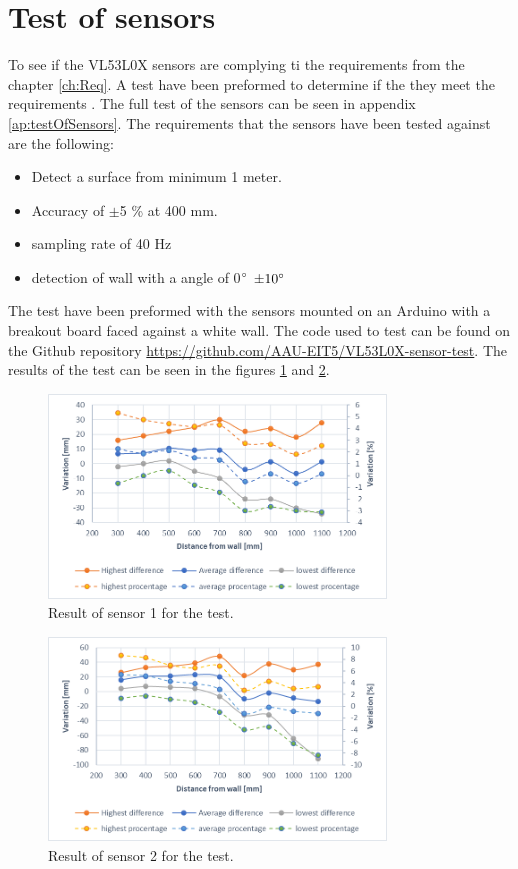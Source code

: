 \section{Test of sensors}
To see if the VL53L0X sensors are complying ti the requirements from the chapter \ref{ch:Req}. A test have been preformed to determine if the they meet the requirements . The full test of the sensors can be seen in appendix \ref{ap:testOfSensors}. The requirements that the sensors have been tested against are the following:
\begin{itemize}
    \item Detect a surface from minimum 1 meter.
    \item Accuracy of $\pm$5 \% at 400 mm.
    \item sampling rate of 40 Hz
    \item detection of wall with a angle of 0$\degree$ $\pm 10 \degree$
\end{itemize}
The test have been preformed with the sensors mounted on an Arduino with a breakout board faced against a white wall. The code used to test can be found on the Github repository \url{https://github.com/AAU-EIT5/VL53L0X-sensor-test}. 
\newline
\newline
The results of the test can be seen in the figures \ref{fig:des_Sensor1TestResult} and \ref{fig:des_Sensor2TestResult}.
\begin{figure}[H]
    \centering
    \includegraphics[width=0.8\textwidth]{figures/Appendix/resultatSensor1Test.png}
    \caption{Result of sensor 1 for the test.}
    \label{fig:des_Sensor1TestResult}
\end{figure}
\begin{figure}[H]
    \centering
    \includegraphics[width=0.8\textwidth]{figures/Appendix/resultatSensor2Test.png}
    \caption{Result of sensor 2 for the test.}
    \label{fig:des_Sensor2TestResult}
\end{figure}
